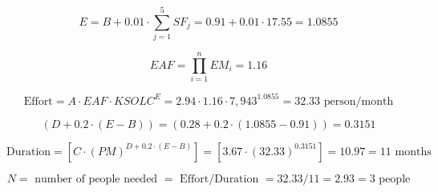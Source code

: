 \[ E = B + 0.01 \cdot \sum_{j=1}^{5}SF_j = 0.91 + 0.01 \cdot 17.55 = 1.0855  \]

\[ EAF = \prod_{i=1}^{n} EM_{i} = 1.16 \]

\[ \text{Effort} = A \cdot EAF \cdot KSOLC^{E} = 2.94 \cdot 1.16 \cdot 7,943 ^{1.0855} = 32.33 \text{ person/month} \]

\[ ( D + 0.2 \cdot (E -B)) =  (0.28 + 0.2 \cdot(1.0855 - 0.91)) = 0.3151 \]

\[ \text{Duration} = [C \cdot (PM)^{D+0.2 \cdot(E-B)}] = [3.67 \cdot (32.33)^{0.3151}] = 10.97 = 11\text{ months} \]

\[ N = \text{ number of people needed } = \text{ Effort/Duration } = 32.33/11 = 2.93 = 3 \text{ people} \]